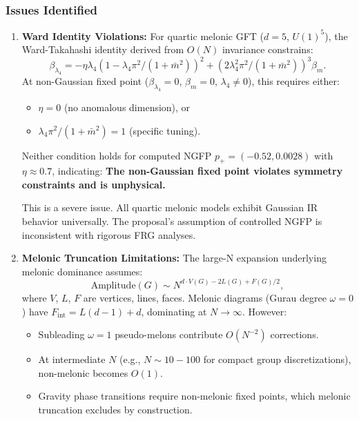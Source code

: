 \documentclass[12pt,a4paper]{article}
\begin{document}
\subsubsection{Issues Identified}

\begin{enumerate}
\item \textbf{Ward Identity Violations:} For quartic melonic GFT (\(d=5\), \(U(1)^5\)), the Ward-Takahashi identity derived from \(O(N)\) invariance constrains:
\begin{equation}
\beta_{\lambda_4} = -\eta \lambda_4 (1 - \lambda_4\pi^2/(1+\bar{m}^2))^2 + (2\lambda_4^2 \pi^2/(1+\bar{m}^2))^3 \beta_m.
\end{equation}
At non-Gaussian fixed point (\(\beta_{\lambda_4}=0\), \(\beta_m=0\), \(\lambda_4 \neq 0\)), this requires either:
\begin{itemize}
\item \(\eta = 0\) (no anomalous dimension), or
\item \(\lambda_4\pi^2/(1+\bar{m}^2) = 1\) (specific tuning).
\end{itemize}
Neither condition holds for computed NGFP \(p_+ = (-0.52, 0.0028)\) with \(\eta \approx 0.7\), indicating: \textbf{The non-Gaussian fixed point violates symmetry constraints and is unphysical.}

This is a severe issue. All quartic melonic models exhibit Gaussian IR behavior universally. The proposal's assumption of controlled NGFP is inconsistent with rigorous FRG analyses.

\item \textbf{Melonic Truncation Limitations:} The large-N expansion underlying melonic dominance assumes:
\begin{equation}
\text{Amplitude}(G) \sim N^{d \cdot V(G) - 2L(G) + F(G)/2},
\end{equation}
where \(V\), \(L\), \(F\) are vertices, lines, faces. Melonic diagrams (Gurau degree \(\omega=0\)) have \(F_{\text{int}} = L(d-1) + d\), dominating at \(N \to \infty\). However:
\begin{itemize}
\item Subleading \(\omega=1\) pseudo-melons contribute \(O(N^{-2})\) corrections.
\item At intermediate \(N\) (e.g., \(N \sim 10-100\) for compact group discretizations), non-melonic becomes \(O(1)\).
\item Gravity phase transitions require non-melonic fixed points, which melonic truncation excludes by construction.
\end{itemize}


\end{enumerate}
\end{document}
